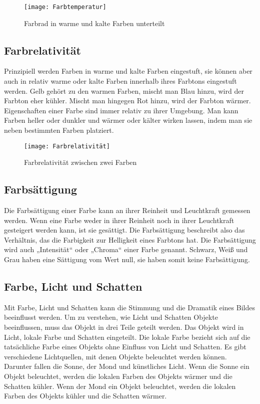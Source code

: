 \begin{figure}[H]
	\centering
	\texttt{[image: Farbtemperatur]}
	\caption{Farbrad in warme und kalte Farben unterteilt\cite{_special_subjects}}
\end{figure}

\subsection{Farbrelativität}
Prinzipiell werden Farben in warme und kalte Farben eingestuft, sie können aber auch in relativ warme oder kalte Farben innerhalb ihres Farbtons eingestuft werden. Gelb gehört zu den warmen Farben, mischt man Blau hinzu, wird der Farbton eher kühler. Mischt man hingegen Rot hinzu, wird der Farbton wärmer. Eigenschaften einer Farbe sind immer relativ zu ihrer Umgebung. Man kann Farben heller oder dunkler und wärmer oder kälter wirken lassen, indem man sie neben bestimmten Farben platziert.
\cite{_special_subjects}

\begin{figure}[H]
	\centering
	\texttt{[image: Farbrelativität]}
	\caption{Farbrelativität zwischen zwei Farben\cite{_special_subjects}}
\end{figure}

\subsection{Farbsättigung}
Die Farbsättigung einer Farbe kann an ihrer Reinheit und Leuchtkraft gemessen werden. Wenn eine Farbe weder in ihrer Reinheit noch in ihrer Leuchtkraft gesteigert werden kann, ist sie gesättigt. Die Farbsättigung beschreibt also das Verhältnis, das die Farbigkeit zur Helligkeit eines Farbtons hat. Die Farbsättigung wird auch „Intensität“ oder „Chroma“ einer Farbe genannt. Schwarz, Weiß und Grau haben eine Sättigung vom Wert null, sie haben somit keine Farbsättigung. 
\cite{_special_subjects}

\subsection{Farbe, Licht und Schatten}
Mit Farbe, Licht und Schatten kann die Stimmung und die Dramatik eines Bildes beeinflusst werden. Um zu verstehen, wie Licht und Schatten Objekte beeinflussen, muss das Objekt in drei Teile geteilt werden. Das Objekt wird in Licht, lokale Farbe und Schatten eingeteilt. Die lokale Farbe bezieht sich auf die tatsächliche Farbe eines Objekts ohne Einfluss von Licht und Schatten. Es gibt verschiedene Lichtquellen, mit denen Objekte beleuchtet werden können. Darunter fallen die Sonne, der Mond und künstliches Licht. Wenn die Sonne ein Objekt beleuchtet, werden die lokalen Farben des Objekts wärmer und die Schatten kühler. Wenn der Mond ein Objekt beleuchtet, werden die lokalen Farben des Objekts kühler und die Schatten wärmer.
\cite{_special_subjects}

